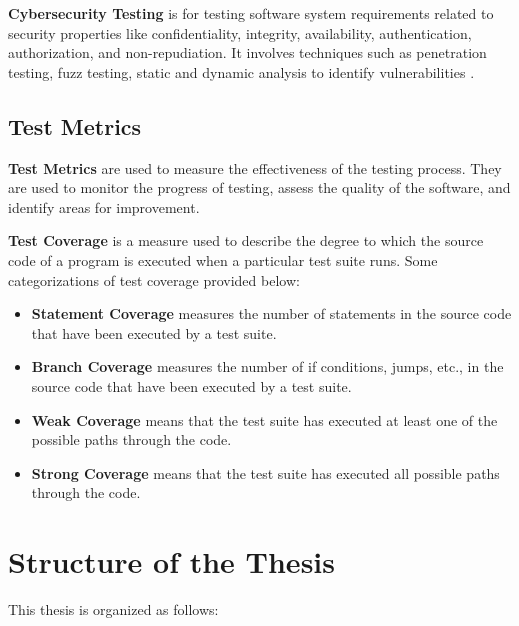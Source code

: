 \textbf{Cybersecurity Testing} is for testing software system requirements related to security properties like confidentiality, integrity, availability, authentication, authorization, and non-repudiation. It involves techniques such as penetration testing, fuzz testing, static and dynamic analysis to identify vulnerabilities \cite{FELDERER20161}.

\subsection{Test Metrics}

\textbf{Test Metrics} are used to measure the effectiveness of the testing process. They are used to monitor the progress of testing, assess the quality of the software, and identify areas for improvement.

\textbf{Test Coverage} is a measure used to describe the degree to which the source code of a program is executed when a particular test suite runs. Some categorizations of test coverage provided below:

\begin{itemize}
    \item \textbf{Statement Coverage} measures the number of statements in the source code that have been executed by a test suite.
    \item \textbf{Branch Coverage} measures the number of if conditions, jumps, etc., in the source code that have been executed by a test suite.
    \item \textbf{Weak Coverage} means that the test suite has executed at least one of the possible paths through the code.
    \item \textbf{Strong Coverage} means that the test suite has executed all possible paths through the code.
\end{itemize}


\section{Structure of the Thesis}

This thesis is organized as follows:

